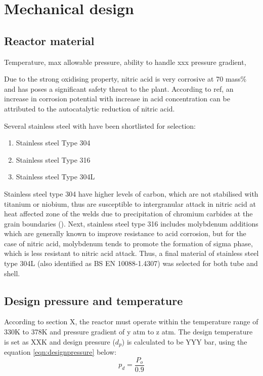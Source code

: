 \section{Mechanical design}
\subsection{Reactor material}
Temperature, max allowable pressure, ability to handle xxx pressure gradient, 

Due to the strong oxidising property, nitric acid is very corrosive at 70 mass\% and has poses a significant safety threat to the plant. According to ref, an increase in corrosion potential with increase in acid concentration can be attributed to the autocatalytic reduction of nitric acid. 

Several stainless steel with have been shortlisted for selection: 
\begin{enumerate}
    \item Stainless steel Type 304
    \item Stainless steel Type 316
    \item Stainless steel Type 304L
\end{enumerate}

Stainless steel type 304 have higher levels of carbon, which are not stabilised with titanium or niobium, thus are susceptible to intergranular attack in nitric acid at heat affected zone of the welds due to precipitation of chromium carbides at the grain boundaries (). Next, stainless steel type 316 includes molybdenum additions which are generally known to improve resistance to acid corrosion, but for the case of nitric acid, molybdenum tends to promote the formation of sigma phase, which is less resistant to nitric acid attack. Thus, a final material of stainless steel type 304L (also identified as BS EN 10088-1.4307) was selected for both tube and shell.

\subsection{Design pressure and temperature}
According to section X, the reactor must operate within the temperature range of 330K to 378K and pressure gradient of y atm to z atm. The design temperature is set as XXK and design pressure ($d_p$) is calculated to be YYY bar, using the equation \ref{eqn:designpressure} below:
\begin{equation}
    p_d = \frac{P_o}{0.9}
    \label{eqn:designpressure}
\end{equation}

